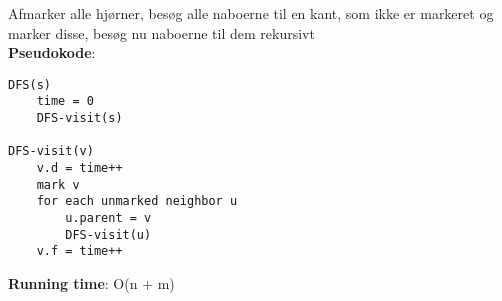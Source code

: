 Afmarker alle hjørner, besøg alle naboerne til en kant, som ikke er markeret og marker disse, besøg nu naboerne til dem rekursivt\\
\textbf{Pseudokode}:
\begin{lstlisting}[frame=single, mathescape=true]
DFS(s)
	time = 0
	DFS-visit(s)

DFS-visit(v)
	v.d = time++
	mark v
	for each unmarked neighbor u
		u.parent = v
		DFS-visit(u)
	v.f = time++
\end{lstlisting}
\textbf{Running time}: O(n + m)
